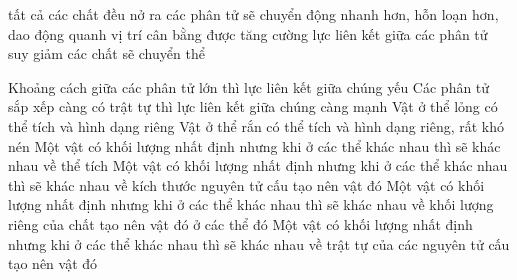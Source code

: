 {tất cả các chất đều nở ra}
{các phân tử sẽ chuyển động nhanh hơn, hỗn loạn hơn, dao động quanh vị trí cân bằng được tăng cường}
{lực liên kết giữa các phân tử suy giảm}
{các chất sẽ chuyển thể}
%			
%			
%			

{Khoảng cách giữa các phân tử lớn thì lực liên kết giữa chúng yếu}
{Các phân tử sắp xếp càng có trật tự thì lực liên kết giữa chúng càng mạnh}
{Vật ở thể lỏng có thể tích và hình dạng riêng}
{Vật ở thể rắn có thể tích và hình dạng riêng, rất khó nén}
%
{Một vật có khối lượng nhất định nhưng khi ở các thể khác nhau thì sẽ khác nhau về thể tích}
{Một vật có khối lượng nhất định nhưng khi ở các thể khác nhau thì sẽ khác nhau về kích thước nguyên tử cấu tạo nên vật đó}
{Một vật có khối lượng nhất định nhưng khi ở các thể khác nhau thì sẽ khác nhau về khối lượng riêng của chất tạo nên vật đó ở các thể đó}
{Một vật có khối lượng nhất định nhưng khi ở các thể khác nhau thì sẽ khác nhau về trật tự của các nguyên tử cấu tạo nên vật đó}

